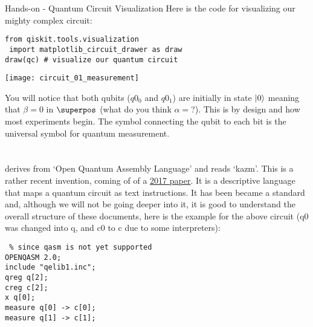 \documentclass[aspectratio=43]{beamer}
\begin{document}
\begin{frame}[fragile]{Hands-on - Quantum Circuit Visualization}
Here is the code for visualizing our mighty complex circuit:
\begin{cardTiny}
\begin{verbatim}
from qiskit.tools.visualization
 import matplotlib_circuit_drawer as draw
draw(qc) # visualize our quantum circuit
\end{verbatim}
\end{cardTiny}
\begin{center}
    \texttt{[image: circuit\_01\_measurement]}
\end{center}
\small{
    You will notice that both qubits ($q0_0$ and $q0_1$) are initially in state $\ket{0}$ meaning that $\beta=0$ in $\superpos$ (what do you think $\alpha=$?). This is by design and how most experiments begin. The symbol connecting the qubit to each bit is the universal symbol for quantum measurement.
}
\end{frame}

\section{\qasm}
\begin{frame}[fragile]{\qasm}
    \begin{cardTiny}
    \small{
    \qasm derives from `Open Quantum Assembly Language' and reads `kazm'. This is a rather recent invention, coming of of a \href{https://arxiv.org/abs/1707.03429}{2017 paper}. It is a descriptive language that maps a quantum circuit as text instructions. It has been became a standard and, although we will not be going deeper into it, it is good to understand the overall structure of these documents, here is the example for the above circuit (q0 was changed into q, and c0 to c due to some \qasm interpreters):
    }
    \end{cardTiny}
    \begin{cardTiny}
    \begin{verbatim} % since qasm is not yet supported
OPENQASM 2.0;
include "qelib1.inc";
qreg q[2];
creg c[2];
x q[0];
measure q[0] -> c[0];
measure q[1] -> c[1];
    \end{verbatim}
    \end{cardTiny}
\end{frame}
\end{document}
